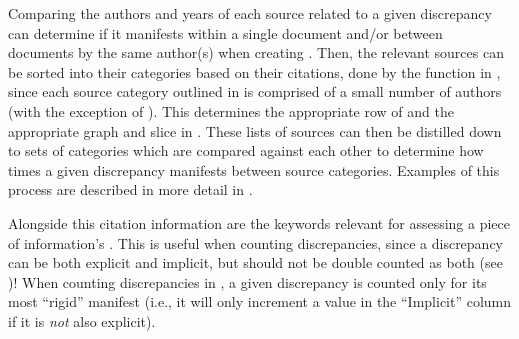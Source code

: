 Comparing the authors and years of each source related to a given discrepancy
can determine if it manifests within a single document and/or between documents
by the same author(s) when creating . Then, the
relevant sources can be sorted into their categories based on their citations,
done by the function in , since each source category
outlined in  is comprised of a small number of authors (with the
exception of \papers{}).
This determines the appropriate row of  and the appropriate
graph and slice in . These lists of sources can then
be distilled down to sets of categories which are compared against
each other to determine how times a given discrepancy manifests between source
categories. Examples of this process are described in more detail in
.

\label{auto-discrep-analysis-rigidity}
Alongside this citation information are the keywords relevant for assessing a
piece of information's . This is useful when counting
discrepancies, since a discrepancy can be both explicit and implicit, but
should not be double counted as both (see )! When counting
discrepancies in , a given discrepancy is counted only for
its most ``rigid'' manifest (i.e., it will only increment a value in the
``Implicit'' column if it is \emph{not} also explicit).

